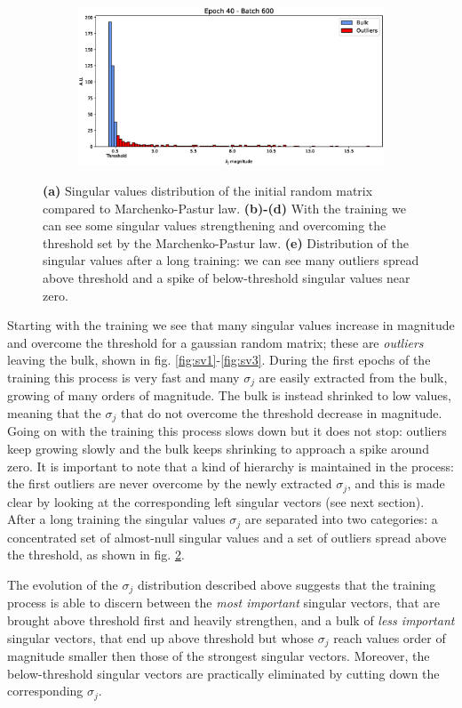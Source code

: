 \documentclass[notitlepage]{revtex4-1}
\begin{document}
\begin{figure}
\begin{subfigure}{.64\linewidth}
    \includegraphics[width=\linewidth]{sv_distr_e40_b600.eps}
    \caption{}  
    \label{fig:sv4}
  \end{subfigure}
 \caption{\textbf{(a)} Singular values distribution of the initial random matrix compared to Marchenko-Pastur law. \textbf{(b)-(d)} With the training we can see some singular values strengthening and overcoming the threshold set by the Marchenko-Pastur law. \textbf{(e)} Distribution of the singular values after a long training: we can see many outliers spread above threshold and a spike of below-threshold singular values near zero.}
\end{figure}

Starting with the training we see that many singular values increase in magnitude and overcome the threshold for a gaussian random matrix; these are \textit{outliers} leaving the bulk, shown in fig. \ref{fig:sv1}-\ref{fig:sv3}. During the first epochs of the training this process is very fast and many \(\sigma_j\) are easily extracted from the bulk, growing of many orders of magnitude. The bulk is instead shrinked to low values, meaning that the \(\sigma_j\) that do not overcome the threshold decrease in magnitude. Going on with the training this process slows down but it does not stop: outliers keep growing slowly and the bulk keeps shrinking to approach a spike around zero. It is important to note that a kind of hierarchy is maintained in the process: the first outliers are never overcome by the newly extracted \(\sigma_j\), and this is made clear by looking at the corresponding left singular vectors (see next section).
After a long training the singular values \(\sigma_j\) are separated into two categories: a concentrated set of almost-null singular values and a set of outliers spread above the threshold, as shown in fig. \ref{fig:sv4}.

The evolution of the \(\sigma_j\) distribution described above suggests that the training process is able to discern between the \textit{most important} singular vectors, that are brought above threshold first and heavily strengthen, and a bulk of \textit{less important} singular vectors, that end up above threshold but whose \( \sigma_j\) reach values order of magnitude smaller then those of the strongest singular vectors. Moreover, the below-threshold singular vectors are practically eliminated by cutting down the corresponding \(\sigma_j\).
\end{document}
